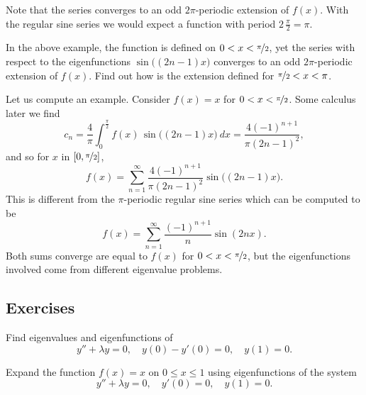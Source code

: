\begin{example}
Note that the series converges to an odd $2\pi$-periodic
extension of $f(x)$.  With the regular sine series we would expect
a function with period $2 \, \frac{\pi}{2} = \pi$.

\begin{exercise}[challenging]
In the above example, the function is defined on $0 < x < \nicefrac{\pi}{2}$,
yet the series with respect to the eigenfunctions
$\sin \bigl( (2n-1)x \bigr)$ converges to an odd $2\pi$-periodic extension of $f(x)$.
Find out how is the extension defined for $\nicefrac{\pi}{2} < x < \pi$.
\end{exercise}

Let us compute an example.
Consider $f(x) = x$ for $0 < x <  \nicefrac{\pi}{2}$.  Some
calculus later we find
\begin{equation*}
c_n = 
\frac{4}{\pi} \int_0^{\frac{\pi}{2}} f(x) \,\sin \bigl( (2n-1)x \bigr) ~ dx 
=
\frac{4{(-1)}^{n+1}}{\pi {(2n-1)}^2} ,
\end{equation*}
and so for $x$ in $[0,\nicefrac{\pi}{2}]$,
\begin{equation*}
f(x) = \sum_{n=1}^\infty \frac{4{(-1)}^{n+1}}{\pi {(2n-1)}^2}
\sin \bigl( (2n-1)x \bigr) .
\end{equation*}
This is different from the $\pi$-periodic regular sine series which can
be computed to be
\begin{equation*}
f(x) = \sum_{n=1}^\infty \frac{{(-1)}^{n+1}}{n}  \sin ( 2nx ) .
\end{equation*}
Both sums converge are equal to $f(x)$ for $0 < x < \nicefrac{\pi}{2}$, but
the eigenfunctions involved come from different eigenvalue problems.
\end{example}

\subsection{Exercises}

\begin{exercise}
Find eigenvalues and eigenfunctions of
\begin{equation*}
y''+\lambda y = 0, \quad y(0)- y'(0) = 0, \quad y(1) = 0 .
\end{equation*}
\end{exercise}

\begin{exercise}
Expand the function $f(x) = x$ on $0 \leq x \leq 1$ using eigenfunctions
of the system
\begin{equation*}
y'' + \lambda y = 0, \quad y'(0) = 0, \quad y(1) = 0 .
\end{equation*}
\end{exercise}

